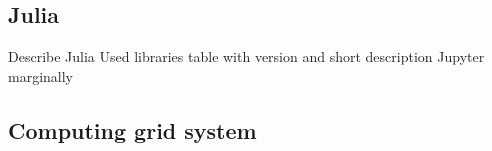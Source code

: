 \subsection*{Julia}
Describe Julia
Used libraries table with version and short description
Jupyter marginally
\subsection*{Computing grid system}







